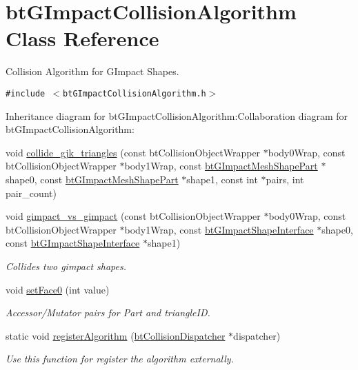\hypertarget{classbt_g_impact_collision_algorithm}{
\section{btGImpactCollisionAlgorithm Class Reference}
\label{classbt_g_impact_collision_algorithm}
}
Collision Algorithm for GImpact Shapes.  


{\tt \#include $<$btGImpactCollisionAlgorithm.h$>$}

Inheritance diagram for btGImpactCollisionAlgorithm:Collaboration diagram for btGImpactCollisionAlgorithm:\begin{CompactItemize}
\item 
void \hyperlink{classbt_g_impact_collision_algorithm_1cc907bcb394f7a95d609b1b56a5490e}{collide\_\-gjk\_\-triangles} (const btCollisionObjectWrapper $\ast$body0Wrap, const btCollisionObjectWrapper $\ast$body1Wrap, const \hyperlink{classbt_g_impact_mesh_shape_part}{btGImpactMeshShapePart} $\ast$shape0, const \hyperlink{classbt_g_impact_mesh_shape_part}{btGImpactMeshShapePart} $\ast$shape1, const int $\ast$pairs, int pair\_\-count)
\item 
void \hyperlink{classbt_g_impact_collision_algorithm_2a6bd5ca4d26e3578d2613543e85429b}{gimpact\_\-vs\_\-gimpact} (const btCollisionObjectWrapper $\ast$body0Wrap, const btCollisionObjectWrapper $\ast$body1Wrap, const \hyperlink{classbt_g_impact_shape_interface}{btGImpactShapeInterface} $\ast$shape0, const \hyperlink{classbt_g_impact_shape_interface}{btGImpactShapeInterface} $\ast$shape1)
\begin{CompactList}\small\item\em Collides two gimpact shapes. \item\end{CompactList}\item 
\hypertarget{classbt_g_impact_collision_algorithm_10e8bcaf1a0b97b227f37fbda2d50403}{
void \hyperlink{classbt_g_impact_collision_algorithm_10e8bcaf1a0b97b227f37fbda2d50403}{setFace0} (int value)}
\label{classbt_g_impact_collision_algorithm_10e8bcaf1a0b97b227f37fbda2d50403}

\begin{CompactList}\small\item\em Accessor/Mutator pairs for Part and triangleID. \item\end{CompactList}\item 
\hypertarget{classbt_g_impact_collision_algorithm_8ddef653ddc1afa7c976abb1ecaf0b98}{
static void \hyperlink{classbt_g_impact_collision_algorithm_8ddef653ddc1afa7c976abb1ecaf0b98}{registerAlgorithm} (\hyperlink{classbt_collision_dispatcher}{btCollisionDispatcher} $\ast$dispatcher)}
\label{classbt_g_impact_collision_algorithm_8ddef653ddc1afa7c976abb1ecaf0b98}

\begin{CompactList}\small\item\em Use this function for register the algorithm externally. \item\end{CompactList}\end{CompactItemize}
